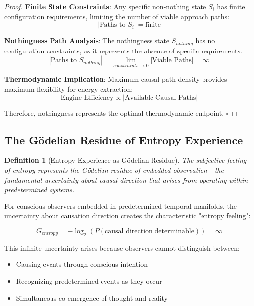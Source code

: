 \documentclass[11pt,a4paper]{article}
\newtheorem{definition}[theorem]{Definition}
\theoremstyle{remark}
\begin{document}
\begin{proof}
\textbf{Finite State Constraints}: Any specific non-nothing state $S_i$ has finite configuration requirements, limiting the number of viable approach paths:
\begin{equation}
|\text{Paths to } S_i| = \text{finite}
\end{equation}

\textbf{Nothingness Path Analysis}: The nothingness state $S_{nothing}$ has no configuration constraints, as it represents the absence of specific requirements:
\begin{equation}
|\text{Paths to } S_{nothing}| = \lim_{constraints \to 0} |\text{Viable Paths}| = \infty
\end{equation}

\textbf{Thermodynamic Implication}: Maximum causal path density provides maximum flexibility for energy extraction:
\begin{equation}
\text{Engine Efficiency} \propto |\text{Available Causal Paths}|
\end{equation}

Therefore, nothingness represents the optimal thermodynamic endpoint. $\square$
\end{proof}

\subsection{The Gödelian Residue of Entropy Experience}

\begin{definition}[Entropy Experience as Gödelian Residue]
The subjective feeling of entropy represents the Gödelian residue of embedded observation - the fundamental uncertainty about causal direction that arises from operating within predetermined systems.
\end{definition}

For conscious observers embedded in predetermined temporal manifolds, the uncertainty about causation direction creates the characteristic "entropy feeling":

\begin{equation}
G_{entropy} = -\log_2(P(\text{causal direction determinable})) = \infty
\label{eq:goedel_entropy}
\end{equation}

This infinite uncertainty arises because observers cannot distinguish between:
\begin{itemize}
\item Causing events through conscious intention
\item Recognizing predetermined events as they occur
\item Simultaneous co-emergence of thought and reality
\end{itemize}
\end{document}
